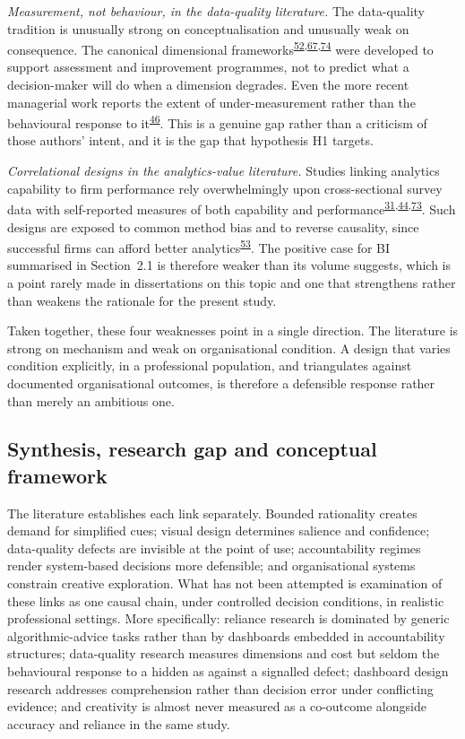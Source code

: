 \documentclass[11pt,a4paper]{article}
\numberwithin{figure}{section}
\numberwithin{table}{section}
\begin{document}
\emph{Measurement, not behaviour, in the data-quality literature.} The data-quality tradition is unusually
strong on conceptualisation and unusually weak on consequence. The canonical dimensional
frameworks\textsuperscript{\hyperlink{ref52}{52},\hyperlink{ref67}{67},\hyperlink{ref74}{74}} were developed to support assessment and improvement
programmes, not to predict what a decision-maker will do when a dimension degrades. Even the more recent
managerial work reports the extent of under-measurement rather than the behavioural response to
it\textsuperscript{\hyperlink{ref46}{46}}. This is a genuine gap rather than a criticism of those authors' intent, and it is the gap
that hypothesis H1 targets.

\emph{Correlational designs in the analytics-value literature.} Studies linking analytics capability to
firm performance rely overwhelmingly upon cross-sectional survey data with self-reported measures of both
capability and performance\textsuperscript{\hyperlink{ref31}{31},\hyperlink{ref44}{44},\hyperlink{ref73}{73}}. Such designs are exposed to
common method bias and to reverse causality, since successful firms can afford better
analytics\textsuperscript{\hyperlink{ref53}{53}}. The positive case for BI summarised in Section~2.1 is therefore weaker than its
volume suggests, which is a point rarely made in dissertations on this topic and one that strengthens
rather than weakens the rationale for the present study.

Taken together, these four weaknesses point in a single direction. The literature is strong on mechanism
and weak on organisational condition. A design that varies condition explicitly, in a professional
population, and triangulates against documented organisational outcomes, is therefore a defensible
response rather than merely an ambitious one.

\subsection{Synthesis, research gap and conceptual framework}

The literature establishes each link separately. Bounded rationality creates demand for simplified cues;
visual design determines salience and confidence; data-quality defects are invisible at the point of use;
accountability regimes render system-based decisions more defensible; and organisational systems constrain
creative exploration. What has not been attempted is examination of these links as one causal chain, under
controlled decision conditions, in realistic professional settings. More specifically: reliance research is
dominated by generic algorithmic-advice tasks rather than by dashboards embedded in accountability
structures; data-quality research measures dimensions and cost but seldom the behavioural response to a
hidden as against a signalled defect; dashboard design research addresses comprehension rather than
decision error under conflicting evidence; and creativity is almost never measured as a co-outcome
alongside accuracy and reliance in the same study.
\end{document}
